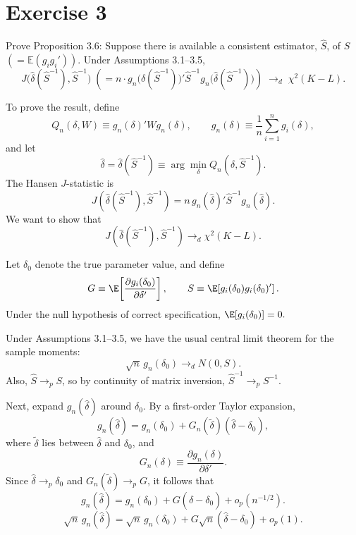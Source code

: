 \documentclass[12pt, letterpaper, onecolumn]{exam}
\begin{document}
\section*{Exercise 3}
Prove Proposition 3.6: Suppose there is available a consistent estimator, $\hat S$, of $S$ $(= \mathbb{E}(g_i g_i'))$. Under Assumptions 3.1--3.5,
$$
    J\bigl(\hat\delta(\hat S^{-1}), \hat S^{-1}\bigr)
    \; \left(= n \cdot g_n\bigl(\hat\delta(\hat S^{-1})\bigr)' \hat S^{-1} g_n\bigl(\hat\delta(\hat S^{-1})\bigr)\right)
    \;\to_d\; \chi^2(K-L).
$$
\begin{solution}
    To prove the result, define
    $$
        Q_n(\delta,W)\equiv g_n(\delta)'Wg_n(\delta),
        \qquad
        g_n(\delta)\equiv \frac1n\sum_{i=1}^n g_i(\delta),
    $$
    and let
    $$
        \hat\delta=\hat\delta(\hat S^{-1})
        \equiv
        \arg\min_{\delta}Q_n(\delta,\hat S^{-1}).
    $$
    The Hansen \(J\)-statistic is
    $$
        J(\hat\delta(\hat S^{-1}),\hat S^{-1})
        =
        n\,g_n(\hat\delta)'\hat S^{-1}g_n(\hat\delta).
    $$
    We want to show that
    $$
        J(\hat\delta(\hat S^{-1}),\hat S^{-1})\to_d \chi^2(K-L).
    $$

    Let \(\delta_0\) denote the true parameter value, and define
    $$
        G\equiv \E\!\left[\frac{\partial g_i(\delta_0)}{\partial\delta'}\right],
        \qquad
        S\equiv \E\!\left[g_i(\delta_0)g_i(\delta_0)'\right].
    $$
    Under the null hypothesis of correct specification, $\E[g_i(\delta_0)]=0.$

    Under Assumptions 3.1--3.5, we have the usual central limit theorem for the sample moments:
    $$
        \sqrt n\,g_n(\delta_0)\to_d N(0,S).
    $$
    Also, \(\hat S\to_p S\), so by continuity of matrix inversion, $\hat S^{-1}\to_p S^{-1}.$

    Next, expand \(g_n(\hat\delta)\) around \(\delta_0\). By a first-order Taylor expansion,
    $$
        g_n(\hat\delta)
        =
        g_n(\delta_0)
        +
        G_n(\tilde\delta)(\hat\delta-\delta_0),
    $$
    where \(\tilde\delta\) lies between \(\hat\delta\) and \(\delta_0\), and
    $$
        G_n(\delta)\equiv \frac{\partial g_n(\delta)}{\partial\delta'}.
    $$
    Since \(\hat\delta\to_p\delta_0\) and \(G_n(\tilde\delta)\to_p G\), it follows that
    $$
        g_n(\hat\delta)
        =
        g_n(\delta_0)+G(\hat\delta-\delta_0)+o_p(n^{-1/2}).
    $$
    $$
        \sqrt n\,g_n(\hat\delta)
        =
        \sqrt n\,g_n(\delta_0)+G\sqrt n(\hat\delta-\delta_0)+o_p(1).
    $$


\end{solution}
\end{document}

